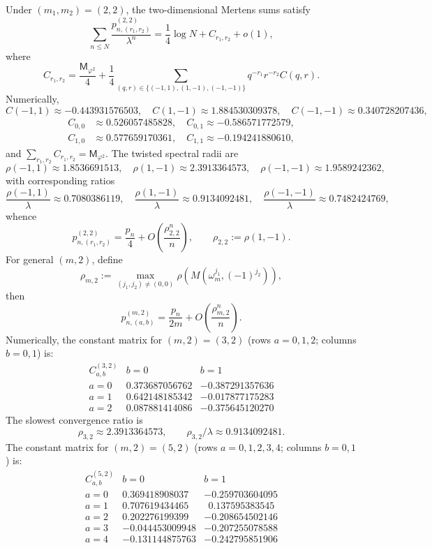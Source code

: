 Under $(m_1,m_2)=(2,2)$, the two-dimensional Mertens sums satisfy
\[
\sum_{n\le N}\frac{p_{n,(r_1,r_2)}^{(2,2)}}{\lambda^n}
=\frac{1}{4}\log N+C_{r_1,r_2}+o(1),
\]
where
\[
C_{r_1,r_2}=\frac{\mathsf{M}_{\varphi^2}}{4}
+\frac{1}{4}\sum_{(q,r)\in\{(-1,1),(1,-1),(-1,-1)\}} q^{-r_1}r^{-r_2}C(q,r).
\]
Numerically,
\[
C(-1,1)\approx -0.443931576503,\quad
C(1,-1)\approx 1.884530309378,\quad
C(-1,-1)\approx 0.340728207436,
\]
\[
\begin{aligned}
C_{0,0}&\approx 0.526057485828,\quad
C_{0,1}\approx -0.586571772579,\\
C_{1,0}&\approx 0.577659170361,\quad
C_{1,1}\approx -0.194241880610,
\end{aligned}
\]
and $\sum_{r_1,r_2}C_{r_1,r_2}=\mathsf{M}_{\varphi^2}$.
The twisted spectral radii are
\[
\rho(-1,1)\approx 1.8536691513,\quad
\rho(1,-1)\approx 2.3913364573,\quad
\rho(-1,-1)\approx 1.9589242362,
\]
with corresponding ratios
\[
\frac{\rho(-1,1)}{\lambda}\approx 0.7080386119,\quad
\frac{\rho(1,-1)}{\lambda}\approx 0.9134092481,\quad
\frac{\rho(-1,-1)}{\lambda}\approx 0.7482424769,
\]
whence
\[
p_{n,(r_1,r_2)}^{(2,2)}=\frac{p_n}{4}+O\!\left(\frac{\rho_{2,2}^n}{n}\right),
\qquad
\rho_{2,2}:=\rho(1,-1).
\]
For general $(m,2)$, define
\[
\rho_{m,2}:=\max_{(j_1,j_2)\neq(0,0)}\rho\!\left(M(\omega_m^{j_1},(-1)^{j_2})\right),
\]
then
\[
p_{n,(a,b)}^{(m,2)}=\frac{p_n}{2m}+O\!\left(\frac{\rho_{m,2}^n}{n}\right).
\]
Numerically, the constant matrix for $(m,2)=(3,2)$ (rows $a=0,1,2$; columns $b=0,1$) is:
\[
\begin{array}{c|cc}
C_{a,b}^{(3,2)} & b=0 & b=1\\
\hline
a=0 & 0.373687056762 & -0.387291357636\\
a=1 & 0.642148185342 & -0.017877175283\\
a=2 & 0.087881414086 & -0.375645120270
\end{array}
\]
The slowest convergence ratio is
\[
\rho_{3,2}\approx 2.3913364573,\qquad \rho_{3,2}/\lambda\approx 0.9134092481.
\]
The constant matrix for $(m,2)=(5,2)$ (rows $a=0,1,2,3,4$; columns $b=0,1$) is:
\[
\begin{array}{c|cc}
C_{a,b}^{(5,2)} & b=0 & b=1\\
\hline
a=0 & 0.369418908037 & -0.259703604095\\
a=1 & 0.707619434465 & \ \ 0.137595383545\\
a=2 & 0.202276199399 & -0.208654502146\\
a=3 & -0.044453009948 & -0.207255078588\\
a=4 & -0.131144875763 & -0.242795851906
\end{array}
\]
